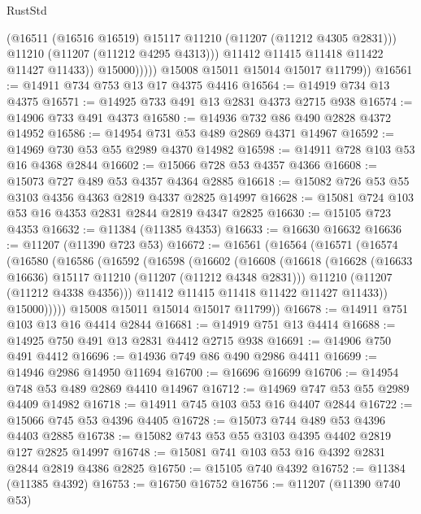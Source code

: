 \begin{lexlean}{RustStd}
\begin{coremodule}
                        (@16511 (@16516 @16519) @15117 @11210 (@11207 (@11212 @4305 @2831)))
                        @11210
                        (@11207 (@11212 @4295 @4313)))
                      @11412
                      @11415
                      @11418
                      @11422
                      @11427
                      @11433))
                  @15000)))))
        @15008
        @15011
        @15014
        @15017
        @11799))
@16561 := @14911 @734 @753 @13 @17 @4375 @4416
@16564 := @14919 @734 @13 @4375
@16571 := @14925 @733 @491 @13 @2831 @4373 @2715 @938
@16574 := @14906 @733 @491 @4373
@16580 := @14936 @732 @86 @490 @2828 @4372 @14952
@16586 := @14954 @731 @53 @489 @2869 @4371 @14967
@16592 := @14969 @730 @53 @55 @2989 @4370 @14982
@16598 := @14911 @728 @103 @53 @16 @4368 @2844
@16602 := @15066 @728 @53 @4357 @4366
@16608 := @15073 @727 @489 @53 @4357 @4364 @2885
@16618 := @15082 @726 @53 @55 @3103 @4356 @4363 @2819 @4337 @2825 @14997
@16628 := @15081 @724 @103 @53 @16 @4353 @2831 @2844 @2819 @4347 @2825
@16630 := @15105 @723 @4353
@16632 := @11384 (@11385 @4353)
@16633 := @16630 @16632
@16636 := @11207 (@11390 @723 @53)
@16672 := @16561
    (@16564
      (@16571
        (@16574
          (@16580
            (@16586
              (@16592
                (@16598
                  (@16602
                    (@16608
                      (@16618
                        (@16628 (@16633 @16636) @15117 @11210 (@11207 (@11212 @4348 @2831)))
                        @11210
                        (@11207 (@11212 @4338 @4356)))
                      @11412
                      @11415
                      @11418
                      @11422
                      @11427
                      @11433))
                  @15000)))))
        @15008
        @15011
        @15014
        @15017
        @11799))
@16678 := @14911 @751 @103 @13 @16 @4414 @2844
@16681 := @14919 @751 @13 @4414
@16688 := @14925 @750 @491 @13 @2831 @4412 @2715 @938
@16691 := @14906 @750 @491 @4412
@16696 := @14936 @749 @86 @490 @2986 @4411
@16699 := @14946 @2986 @14950 @11694
@16700 := @16696 @16699
@16706 := @14954 @748 @53 @489 @2869 @4410 @14967
@16712 := @14969 @747 @53 @55 @2989 @4409 @14982
@16718 := @14911 @745 @103 @53 @16 @4407 @2844
@16722 := @15066 @745 @53 @4396 @4405
@16728 := @15073 @744 @489 @53 @4396 @4403 @2885
@16738 := @15082 @743 @53 @55 @3103 @4395 @4402 @2819 @127 @2825 @14997
@16748 := @15081 @741 @103 @53 @16 @4392 @2831 @2844 @2819 @4386 @2825
@16750 := @15105 @740 @4392
@16752 := @11384 (@11385 @4392)
@16753 := @16750 @16752
@16756 := @11207 (@11390 @740 @53)

\end{coremodule}
\end{lexlean}

